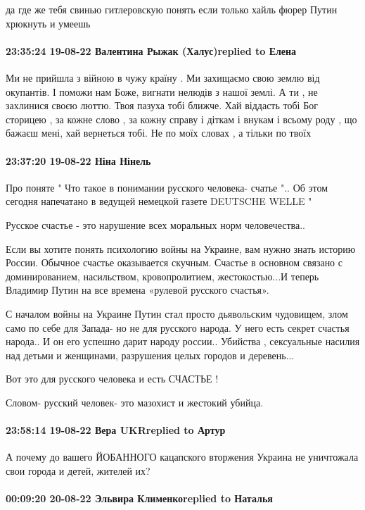 да где же тебя свинью гитлеровскую понять если только хайль фюрер Путин
хрюкнуть и умеешь 

\paragraph{23:35:24 19-08-22 Валентина Рыжак (Халус)replied to Елена}

Ми не прийшла з війною в чужу країну . Ми захищаємо свою землю від окупантів. І
поможи нам Боже, вигнати нелюдів з нашої землі. А ти , не  захлинися своєю
люттю. Твоя пазуха тобі ближче. Хай віддасть тобі Бог сторицею , за кожне слово
, за кожну справу і діткам і внукам і всьому роду , що бажаєш мені, хай
вернеться тобі. Не по моїх словах , а тільки по твоїх 

\paragraph{23:37:20 19-08-22 Ніна Нінель}

Про поняте " Что такое в понимании русского человека- счатье ".. Об этом
сегодня напечатано в ведущей немецкой газете DEUTSCHE WELLE "

Русское счастье - это нарушение всех моральных норм человечества..

Если вы хотите понять психологию войны на Украине, вам нужно знать историю
России. Обычное счастье оказывается скучным. Счастье в основном связано с
доминированием, насильством, кровопролитием, жестокостью...И теперь Владимир
Путин на все времена «рулевой русского счастья». 

С началом войны на Украине Путин стал просто дьявольским чудовищем, злом само
по себе для Запада- но не для русского народа. У него есть секрет счастья
народа.. И он его успешно дарит народу россии.. Убийства , сексуальные насилия
над детьми и женщинами, разрушения целых городов и деревень...

Вот это для русского человека и есть СЧАСТЬЕ !

Словом- русский человек- это мазохист и жестокий убийца.

\paragraph{23:58:14 19-08-22 Вера UKRreplied to Артур}

А почему до вашего ЙОБАННОГО кацапского вторжения Украина не уничтожала свои
города и детей, жителей их?

\paragraph{00:09:20 20-08-22 Эльвира Клименкоreplied to Наталья}

